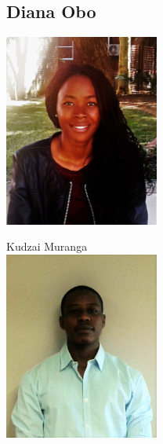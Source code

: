 \documentclass[a4paper,12pt]{article}
\begin{document}
\subsection{Diana Obo}
\includegraphics[width=2in]{Diana.jpg}\\[0.4cm] 
\newpage

\begin{center}
{\Large Kudzai {Muranga}} \\[0.3cm]
\includegraphics[width= 2in]{Kudzai.jpg}\\[0.4cm] 
\end{center}
\end{document}
